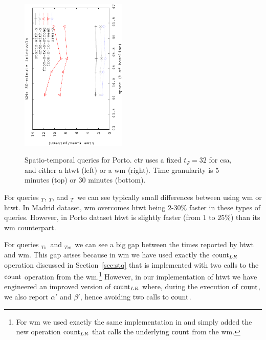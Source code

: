 \begin{figure}[!ht]
\begin{center}
			{\includegraphics[angle=-90,width=0.45\textwidth]{figures_synt/porto_wm30.eps}}
			
			
			
		\end{center}
		\vspace{-0.3cm}
		\caption{Spatio-temporal queries for Porto. \acrshort{ctr} uses a fixed $t_{\Psi}=32$ for \acrlong{csa}, 
			and either a \acrlong{htwt} (left) or a \acrlong{wm} (right). 
			Time granularity is $5$ minutes (top) or $30$ minutes (bottom). 
		}
		\label{fig:portost}
	\end{figure}





	For queries \startX$_T$, \endX$_T$, and \loadX$_T$\ we can see typically small differences between using \gls{wm} or \gls{htwt}. In 
	Madrid dataset, \gls{wm} overcomes \gls{htwt} being $2$-$30$\% faster in these types of queries. 
	However, in Porto dataset \gls{htwt} is slightly 
	faster (from $1$ to $25$\%) than its \gls{wm} counterpart.

	For queries \XtoY$_{Ts}$\ and \XtoY$_{Tw}$\ we can see a big gap between the times reported by \gls{htwt} and \gls{wm}.
	This gap arises because in \gls{wm} we have used exactly the $\operatorname{count}_{LR}$ operation discussed in Section~\ref{sec:stq}
	that is implemented with two calls to the $\operatorname{count}$ operation from the \gls{wm}.\footnote{For \gls{wm} we used exactly the same 
		implementation in \cite{CNO15} and simply added the new operation $\operatorname{count}_{LR}$ that calls the underlying $\operatorname{count}$ from the
		\gls{wm}. }  
	However, in our implementation of
	\gls{htwt} we have engineered an improved version of $\operatorname{count}_{LR}$ where, during the execution of $\operatorname{count}$, we also report
	$\alpha'$ and  $\beta'$, hence avoiding two calls to $\operatorname{count}$.
	 
